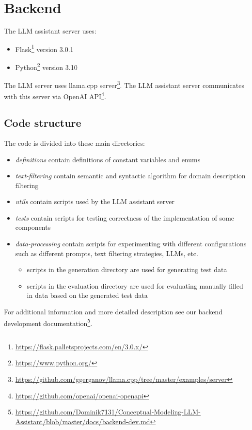 \section{Backend}

\noindent{}The LLM assistant server uses:
\begin{itemize}
\item Flask\footnote{\url{https://flask.palletsprojects.com/en/3.0.x/}} version 3.0.1
\item Python\footnote{\url{https://www.python.org/}} version 3.10
\end{itemize}

\noindent{}The LLM server uses llama.cpp server\footnote{\url{https://github.com/ggerganov/llama.cpp/tree/master/examples/server}}. The LLM assistant server communicates with this server via OpenAI API\footnote{\url{https://github.com/openai/openai-openapi}}.


\subsection{Code structure}

\noindent{}The code is divided into these main directories:
\begin{itemize}
\item \textit{definitions} contain definitions of constant variables and enums
\item \textit{text-filtering} contain semantic and syntactic algorithm for domain description filtering
\item \textit{utils} contain scripts used by the LLM assistant server
\item \textit{tests} contain scripts for testing correctness of the implementation of some components
\item \textit{data-processing} contain scripts for experimenting with different configurations such as different prompts, text filtering strategies, LLMs, etc.
\begin{itemize}
\item scripts in the generation directory are used for generating test data
\item scripts in the evaluation directory are used for evaluating manually filled in data based on the generated test data
\end{itemize}
\end{itemize}

\noindent{}For additional information and more detailed description see our backend development documentation\footnote{\url{https://github.com/Dominik7131/Conceptual-Modeling-LLM-Assistant/blob/master/docs/backend-dev.md}}.

